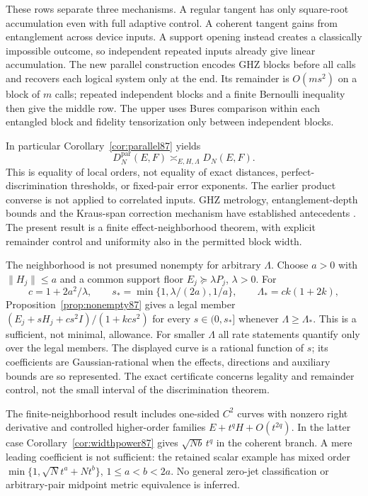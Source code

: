 These rows separate three mechanisms.  A regular tangent has only
square-root accumulation even with full adaptive control.  A
coherent tangent gains from entanglement across device inputs.
A support opening instead creates a classically impossible outcome,
so independent repeated inputs already give linear accumulation.
The new parallel construction encodes GHZ blocks before all calls
and recovers each logical system only at the end.  Its remainder is
$O(ms^2)$ on a block of $m$ calls; repeated independent blocks and
a finite Bernoulli inequality then give the middle row.  The upper
uses Bures comparison within each entangled block and fidelity
tensorization only between independent blocks.

In particular Corollary~\ref{cor:parallel87} yields
\[
 D_N^{\mathrm{par}}(E,F)\asymp_{E,H,\Lambda}D_N(E,F).
\]
This is equality of local orders, not equality of exact distances,
perfect-discrimination thresholds, or fixed-pair error exponents.
The earlier product converse is not applied to correlated inputs.
GHZ metrology, entanglement-depth bounds and the Kraus-span correction
mechanism have established antecedents
\cite{Hyllus78,Toth78,ZJ84,KL84}.  The present result is a
finite effect-neighborhood theorem, with explicit remainder control
and uniformity also in the permitted block width.

The neighborhood is not presumed nonempty for arbitrary $\Lambda$.
Choose $a>0$ with $\|H_j\|\le a$ and a common support floor
$E_j\succeq\lambda P_j$, $\lambda>0$.  For
\[
 c=1+2a^2/\lambda,\qquad
 s_* =\min\{1,\lambda/(2a),1/a\},\qquad
 \Lambda_*=ck(1+2k),
\]
Proposition~\ref{prop:nonempty87} gives a legal member
$(E_j+sH_j+cs^2I)/(1+kcs^2)$ for every $s\in(0,s_*]$
whenever $\Lambda\ge\Lambda_*$.  This is a sufficient, not
minimal, allowance.  For smaller $\Lambda$ all rate statements
quantify only over the legal members.  The displayed curve is a
rational function of $s$; its coefficients are Gaussian-rational
when the effects, directions and auxiliary bounds are so represented.
The exact certificate concerns legality and remainder control,
not the small interval of the discrimination theorem.

The finite-neighborhood result includes one-sided $C^2$ curves with
nonzero right derivative and controlled higher-order families
$E+t^qH+O(t^{2q})$.  In the latter case
Corollary~\ref{cor:widthpower87} gives $\sqrt{Nb}\,t^q$
in the coherent branch.  A mere leading coefficient is not sufficient:
the retained scalar example has mixed order
$\min\{1,\sqrt N t^a+Nt^b\}$, $1\le a<b<2a$.
No general zero-jet classification or arbitrary-pair midpoint
metric equivalence is inferred.

